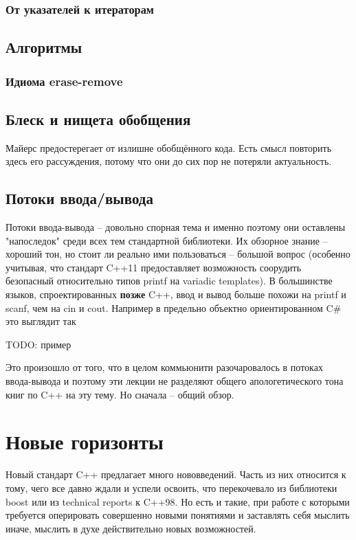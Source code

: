 \documentclass[a4paper,12pt,oneside]{article}
\begin{document}
\subsubsection{От указателей к итераторам}

\subsection{Алгоритмы}

\subsubsection{Идиома erase-remove}

\subsection{Блеск и нищета обобщения}

Майерс \cite{effectivestl} предостерегает от излишне обобщённого кода. Есть смысл повторить здесь его рассуждения, потому что они до сих пор не потеряли актуальность. 

\subsection{Потоки ввода/вывода}

Потоки ввода-вывода -- довольно спорная тема и именно поэтому они оставлены "напоследок" среди всех тем стандартной библиотеки. Их обзорное знание -- хороший тон, но стоит ли реально ими пользоваться -- большой вопрос (особенно учитывая, что стандарт C++11 предоставляет возможность соорудить безопасный относительно типов printf на variadic templates). В большинстве языков, спроектированных \textbf{позже} C++, ввод и вывод больше похожи на printf и scanf, чем на cin и cout. Например в предельно объектно ориентированном C\# это выглядит так

TODO: пример

Это произошло от того, что в целом коммьюнити разочаровалось в потоках ввода-вывода и поэтому эти лекции не разделяют общего апологетического тона книг по C++ на эту тему. Но сначала -- общий обзор.

\pagebreak
\section{Новые горизонты}

Новый стандарт C++ предлагает много нововведений. Часть из них относится к тому, чего все давно ждали и успели освоить, что перекочевало из библиотеки boost или из technical reports к C++98. Но есть и такие, при работе с которыми требуется оперировать совершенно новыми понятиями и заставлять себя мыслить иначе, мыслить в духе действительно новых возможностей.
\end{document}
